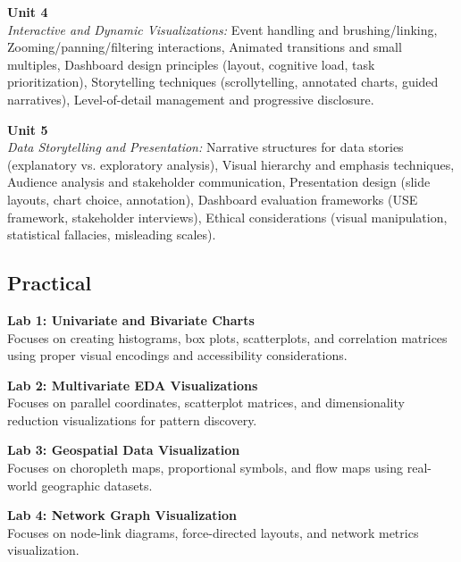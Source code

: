 \noindent\textbf{Unit 4} \\
\textit{Interactive and Dynamic Visualizations:} Event handling and brushing/linking, Zooming/panning/filtering interactions, Animated transitions and small multiples, Dashboard design principles (layout, cognitive load, task prioritization), Storytelling techniques (scrollytelling, annotated charts, guided narratives), Level-of-detail management and progressive disclosure.

\vspace{0.3cm}

\noindent\textbf{Unit 5} \\
\textit{Data Storytelling and Presentation:} Narrative structures for data stories (explanatory vs. exploratory analysis), Visual hierarchy and emphasis techniques, Audience analysis and stakeholder communication, Presentation design (slide layouts, chart choice, annotation), Dashboard evaluation frameworks (USE framework, stakeholder interviews), Ethical considerations (visual manipulation, statistical fallacies, misleading scales).

\newpage

\subsection*{Practical}
\noindent\textbf{Lab 1: Univariate and Bivariate Charts} \\
Focuses on creating histograms, box plots, scatterplots, and correlation matrices using proper visual encodings and accessibility considerations.

\vspace{0.2cm}

\noindent\textbf{Lab 2: Multivariate EDA Visualizations} \\
Focuses on parallel coordinates, scatterplot matrices, and dimensionality reduction visualizations for pattern discovery.

\vspace{0.2cm}

\noindent\textbf{Lab 3: Geospatial Data Visualization} \\
Focuses on choropleth maps, proportional symbols, and flow maps using real-world geographic datasets.

\vspace{0.2cm}

\noindent\textbf{Lab 4: Network Graph Visualization} \\
Focuses on node-link diagrams, force-directed layouts, and network metrics visualization.

